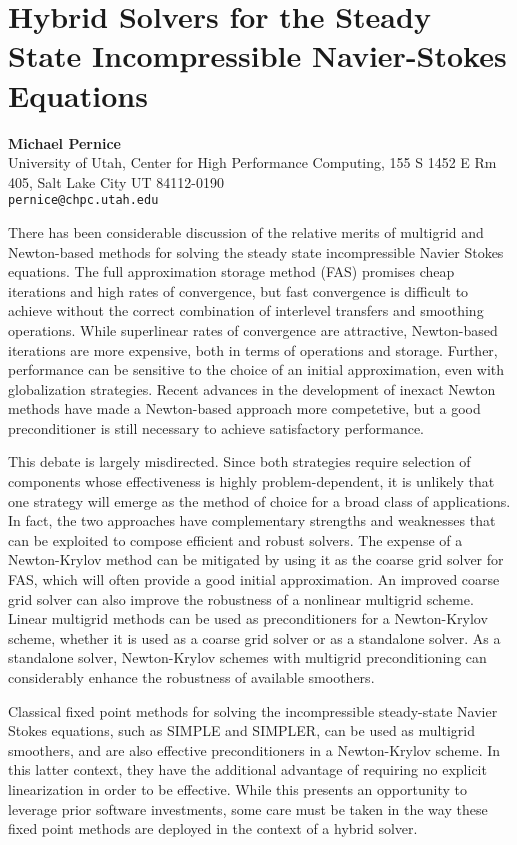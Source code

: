 \documentclass[11pt]{article}
\newcommand{\nextab}[4]{
	\section{#2}
	{\bf #1} \\ \nopagebreak
	{#3} \\ \nopagebreak
	{\tt #4} \nopagebreak
	}
\begin{document}

\nextab{Michael Pernice}
	{Hybrid Solvers for the Steady State
	Incompressible Navier-Stokes Equations}
	{University of Utah,
	Center for High Performance Computing,
	155 S 1452 E Rm 405,
	Salt Lake City UT  84112-0190}
	{pernice@chpc.utah.edu}

There has been considerable discussion of the relative merits of
multigrid and Newton-based methods for solving the steady state
incompressible Navier Stokes equations.  The full approximation
storage method (FAS) promises cheap iterations and high rates of
convergence, but fast convergence is difficult to achieve without the
correct combination of interlevel transfers and smoothing operations.
While superlinear rates of convergence are attractive, Newton-based
iterations are more expensive, both in terms of operations and
storage.  Further, performance can be sensitive to the choice of an
initial approximation, even with globalization strategies.  Recent
advances in the development of inexact Newton methods have made a
Newton-based approach more competetive, but a good preconditioner is
still necessary to achieve satisfactory performance.

This debate is largely misdirected.  Since both strategies require
selection of components whose effectiveness is highly
problem-dependent, it is unlikely that one strategy will emerge as the
method of choice for a broad class of applications.  In fact, the two
approaches have complementary strengths and weaknesses that can be
exploited to compose efficient and robust solvers.  The expense of a
Newton-Krylov method can be mitigated by using it as the coarse grid
solver for FAS, which will often provide a good initial approximation.
An improved coarse grid solver can also improve the robustness of a
nonlinear multigrid scheme.  Linear multigrid methods can be used as
preconditioners for a Newton-Krylov scheme, whether it is used as a
coarse grid solver or as a standalone solver.  As a standalone solver,
Newton-Krylov schemes with multigrid preconditioning can considerably
enhance the robustness of available smoothers.

Classical fixed point methods for solving the incompressible
steady-state Navier Stokes equations, such as SIMPLE and SIMPLER, can
be used as multigrid smoothers, and are also effective preconditioners
in a Newton-Krylov scheme.  In this latter context, they have the
additional advantage of requiring no explicit linearization in order
to be effective.  While this presents an opportunity to leverage prior
software investments, some care must be taken in the way these fixed
point methods are deployed in the context of a hybrid solver.
\end{document}
